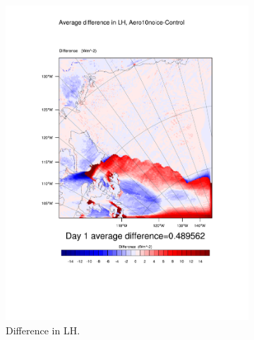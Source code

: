\begin{figure}
\centering
	\begin{subfigure}{0.48\textwidth}
		\includegraphics[width=\textwidth]{results/aero10ni/diff_Aero10NoIce_LH_Day1.pdf}
		\caption{Difference in LH.}
		\label{subfig:lh_r4Day1}
	\end{subfigure}
	\quad
	\begin{subfigure}{0.48\textwidth}

\end{subfigure}
\end{figure}
